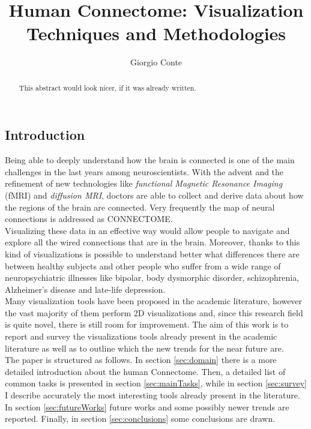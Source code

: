 \documentclass{article}
\title{Human Connectome: Visualization Techniques and Methodologies}
\author{Giorgio Conte}
\affil{Creative Coding Research Group\\ Department of Computer Science\\University of Illinois at Chicago}
\begin{document}
\maketitle
\begin{abstract}
This abstract would look nicer, if it was already written.
\end{abstract}

\begin{multicols}{2}
\raggedcolumns

\section{Introduction}
\label{sec:introduction}

Being able to deeply understand how the brain is connected is one of the main challenges in the last years among neuroscientists. With the advent and the refinement of new technologies like \textit{functional Magnetic Resonance Imaging} (fMRI) and \textit{diffusion MRI}, doctors are able to collect and derive data about how the regions of the brain are connected. Very frequently the map of neural connections is addressed as CONNECTOME.\\
Visualizing these data in an effective way would allow people to navigate and explore all the wired connections that are in the brain. Moreover, thanks to this kind of visualizations is possible to understand better what differences there are between healthy subjects and other people who suffer from a wide range of neuropsychiatric illnesses like bipolar, body dysmorphic disorder, schizophrenia, Alzheimer's disease and late-life depression. \\
Many visualization tools have been proposed in the academic literature, however the vast majority of them perform 2D visualizations and, since this research field is quite novel, there is still room for improvement.
The aim of this work is to report and survey the visualizations tools already present in the academic literature as well as to outline which the new trends for the near future are.\\
The paper is structured as follows. In section \ref{sec:domain} there is a more detailed introduction about the human Connectome. Then, a detailed list of common tasks is presented in section \ref{sec:mainTasks}, while in section \ref{sec:survey} I describe accurately the most interesting tools already present in the literature. In section \ref{sec:futureWorks} future works and some possibly newer trends are reported. Finally, in section \ref{sec:conclusions} some conclusions are drawn.

\end{multicols}
\end{document}
